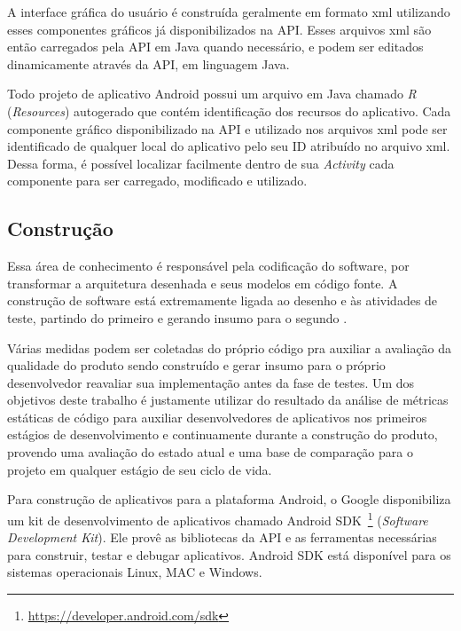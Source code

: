 A interface gráfica do usuário é construída geralmente em formato xml utilizando esses componentes gráficos já disponibilizados na API. Esses arquivos xml são então carregados pela API em Java quando necessário, e podem ser editados dinamicamente através da API, em linguagem Java.

Todo projeto de aplicativo Android possui um arquivo em Java chamado \textit{R} (\textit{Resources}) autogerado que contém identificação dos recursos do aplicativo. Cada componente gráfico disponibilizado na API e utilizado nos arquivos xml pode ser identificado de qualquer local do aplicativo pelo seu ID atribuído no arquivo xml. Dessa forma, é possível localizar facilmente dentro de sua \textit{Activity} cada componente para ser carregado, modificado e utilizado.

\subsection{Construção}

Essa área de conhecimento é responsável pela codificação do software, por transformar a arquitetura desenhada e seus modelos em código fonte. A construção de software está extremamente ligada ao desenho e às atividades de teste, partindo do primeiro e gerando insumo para o segundo \cite{swebok}.

Várias medidas podem ser coletadas do próprio código pra auxiliar a avaliação da qualidade do produto sendo construído e gerar insumo para o próprio desenvolvedor reavaliar sua implementação antes da fase de testes. Um dos objetivos deste trabalho é justamente utilizar do resultado da análise de métricas estáticas de código para auxiliar desenvolvedores de aplicativos nos primeiros estágios de desenvolvimento e continuamente durante a construção do produto, provendo uma avaliação do estado atual e uma base de comparação para o projeto em qualquer estágio de seu ciclo de vida.

Para construção de aplicativos para a plataforma Android, o Google disponibiliza um kit de desenvolvimento de aplicativos chamado Android SDK~\footnote{\url{https://developer.android.com/sdk}} (\textit{Software Development Kit}). Ele provê as bibliotecas da API e as ferramentas necessárias para construir, testar e debugar aplicativos. Android SDK está disponível para os sistemas operacionais Linux, MAC e Windows.

